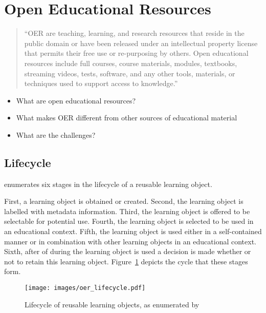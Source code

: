 \section{Open Educational Resources}
\begin{quote}
``OER are teaching, learning, and research resources that reside in the public domain or have
been released under an intellectual property license that permits their free
use or re-purposing by others. Open educational resources include full courses,
course materials, modules, textbooks, streaming videos, tests, software, and
any other tools, materials, or techniques used to support access to
knowledge.''
\end{quote}
\begin{itemize}
	\item What are open educational resources?
	\item What makes OER different from other sources of educational material
	\item What are the challenges?
\end{itemize}

\subsection{Lifecycle}
\label{sec:background_oer_lifecycle}
\citet{Collis2004}
enumerates six stages in the lifecycle of a reusable learning object. 

First, a learning object is obtained or created. Second, the learning object is labelled
with metadata information. Third, the learning object is offered to be
selectable for potential use.  Fourth, the learning object is selected
to be used in an educational context. Fifth, the learning object is used either in a
self-contained manner or in combination with other learning objects in an
educational context. Sixth, after of during the learning object is used a
decision is made whether or not to retain this learning object.
Figure~\ref{fig:oer_lifecycle} depicts the cycle that these stages form.
\begin{figure}[h!]
	\centering
	\texttt{[image: images/oer\_lifecycle.pdf]}
	\caption[Lifecycle of reusable learning objects]{Lifecycle of reusable learning objects, as enumerated by \citep{Collis2004}}
	\label{fig:oer_lifecycle}
\end{figure}


